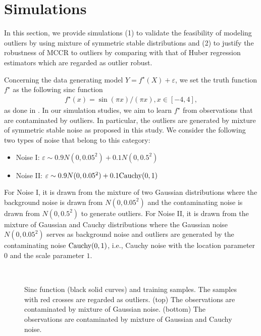 \documentclass[11pt]{article}
\begin{document}
\section{Simulations}
In this section, we provide simulations (1) to validate the feasibility of modeling outliers by using mixture of symmetric stable distributions and (2) to justify the robustness of MCCR to outliers by comparing with that of Huber regression estimators which are regarded as outlier robust. 

Concerning the data generating model $Y=f^\star(X)+\varepsilon$, we set the truth function $f^\star$ as the following sinc function  
\begin{align*}
f^\star(x)=\sin(\pi x)/(\pi x), x\in [-4,4],
\end{align*}  
as done in \cite{vapnik1998statistical,smola2004tutorial}. In our simulation studies, we aim to learn $f^\star$ from observations that are contaminated by outliers. In particular, the outliers are generated by mixture of symmetric stable noise as proposed in this study. We consider the following two types of noise that belong to this category:
\begin{itemize}
	\item Noise I: $\varepsilon \sim 0.9N(0,0.05^2)+0.1N(0,0.5^2)$
	\item Noise II: $\varepsilon \sim 0.9N(0,0.05^2)+0.1\hbox{Cauchy}(0,1)$
\end{itemize} 
For Noise I, it is drawn from the mixture of two Gaussian distributions where the background noise is drawn from $N(0,0.05^2)$ and the contaminating noise is drawn from $N(0,0.5^2)$ to generate outliers. For Noise II, it is drawn from the mixture of Gaussian and Cauchy distributions where the Gaussian noise $N(0,0.05^2)$ serves as background noise and outliers are generated by the contaminating noise $\hbox{Cauchy}(0,1)$, i.e., Cauchy noise with the location parameter $0$ and the scale parameter $1$.   
  
\begin{figure}[!htb]
	\centering
	\begin{minipage}[b]{1\textwidth}
		\centering
		
	\end{minipage}%
	\\
	\bigskip
	\begin{minipage}[b]{1\textwidth}
		\centering
		
	\end{minipage}%
	\caption{Sinc function (black solid curves) and training samples. The samples with red crosses are regarded as outliers. (top) The observations are contaminated by mixture of Gaussian noise. (bottom) The observations are contaminated by mixture of Gaussian and Cauchy noise.}
	\label{outliers_generating}
\end{figure} 
\end{document}
